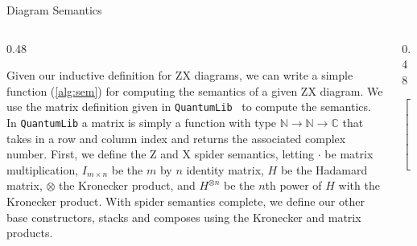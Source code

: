 \documentclass[final]{beamer}
\newlength{\colwidth}
\newcommand{\C}{\mathbb{C}}
\newcommand{\N}{\mathbb{N}}
\newcommand{\QLib}{\texttt{QuantumLib}\xspace}
\begin{document}
\begin{frame}[t]
\begin{columns}[t]
\begin{column}{\colwidth}
  \begin{block}{Diagram Semantics}

    \begin{columns}

      \begin{column}{0.48\colwidth}
        \justify
    
        Given our inductive definition for ZX diagrams, we can write a simple function (\ref{alg:sem}) for computing the semantics of a given ZX diagram.
        We use the matrix definition given in \QLib~\cite{QuantumLib} to compute the semantics.
        In \QLib a matrix is simply a function with type $\N \to \N \to \C$ that takes in a row and column index and returns the associated complex number.
        First, we define the Z and X spider semantics, letting $\cdot$ be matrix multiplication, $I_{m\times n}$ be the $m$ by $n$ identity matrix, $H$ be the Hadamard matrix, $\otimes$ the Kronecker product, and $H^{\otimes n}$ be the $n$th power of $H$ with the Kronecker product.
        With spider semantics complete, we define our other base constructors, stacks and composes using the Kronecker and matrix products.

      \end{column}
      \begin{column}{0.48\colwidth}
        \begin{algorithm}[H]
          \caption{ZX Diagram Semantics}\label{alg:sem}
          \scriptsize
          \begin{algorithmic}
                \State \Return \(\begin{bmatrix}
                                    1 & 0 & \cdots & 0 & 0\\
                                    0 & 0 & \cdots & 0 & 0\\
                                    \vdots & & \ddots & & \vdots\\
                                    0 & 0 & \cdots & 0 & 0\\
                                    0 & 0 & \cdots & 0 & e^{i\alpha}\\
                                \end{bmatrix}\)
            \EndFunction


\end{algorithmic}
\end{algorithm}
\end{column}
\end{columns}
\end{block}
\end{column}
\end{columns}
\end{frame}
\end{document}
